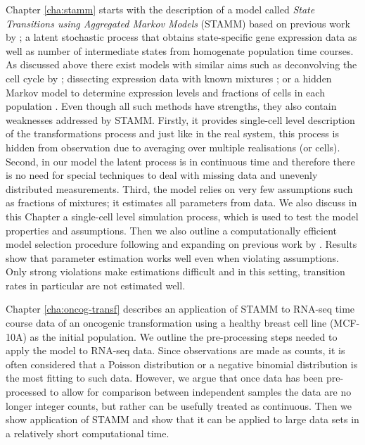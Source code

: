 
Chapter \ref{cha:stamm} starts with the description of a model called \emph{State Transitions using Aggregated Markov Models} (STAMM) based on previous work by \cite{Armond:2013}; a latent stochastic process that obtains state-specific gene expression data as well as number of intermediate states from homogenate population time courses. As discussed above there exist models with similar aims such as deconvolving the cell cycle by \cite{Bar-Joseph04082004}; dissecting expression data with known mixtures \citep{Lahdesmaki:2005fh}; or a hidden Markov model to determine expression levels and fractions of cells in each population \citep{Roy:2006ik}. Even though all such methods have strengths, they also contain weaknesses addressed by STAMM. Firstly, it provides single-cell level description of the transformations process and just like in the real system, this process is hidden from observation due to averaging over multiple realisations (or cells). Second, in our model the latent process is in continuous time and therefore there is no need for special techniques to deal with missing data and unevenly distributed measurements. Third, the model relies on very few assumptions such as fractions of mixtures; it estimates all parameters from data. We also discuss in this Chapter a single-cell level simulation process, which is used to test the model properties and assumptions. Then we also outline a computationally efficient model selection procedure following and expanding on previous work by \cite{Armond:2013}. Results show that parameter estimation works well even when violating assumptions. Only strong violations make estimations difficult and in this setting, transition rates in particular are not estimated well.

 Chapter \ref{cha:oncog-transf} describes an application of STAMM to RNA-seq time course data of an oncogenic transformation using a healthy breast cell line (MCF-10A) as the initial population. We outline the pre-processing steps needed to apply the model to RNA-seq data. Since observations are made as counts, it is often considered that a Poisson distribution or a negative binomial distribution is the most fitting to such data. However, we argue that once data has been pre-processed to allow for comparison between independent samples the data are no longer integer counts, but rather can be usefully treated as continuous. Then we show application of STAMM and show that it can be applied to large data sets in a relatively short computational time.

